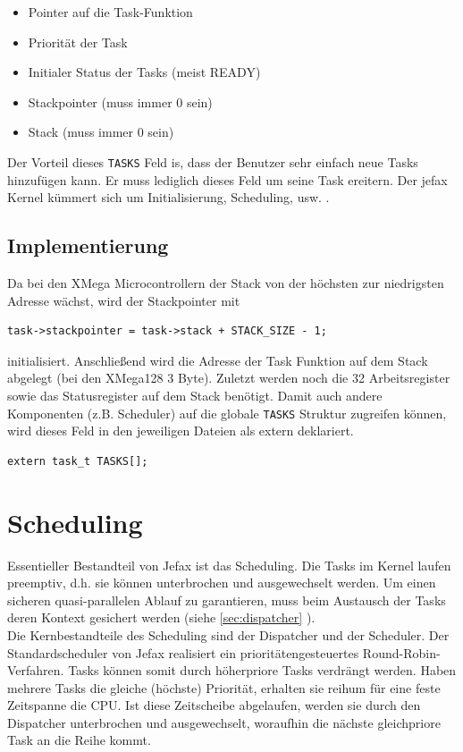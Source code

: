\documentclass[fontsize=12pt, toc=bibliography, notitlepage]{scrreprt}
\newcommand{\refnn}[1]{\ref{#1} \nameref{#1}}
\begin{document}
\begin{itemize}
\item Pointer auf die Task-Funktion
\item Priorität der Task
\item Initialer Status der Tasks (meist READY)
\item Stackpointer (muss immer 0 sein)
\item Stack (muss immer {0} sein)
\end{itemize}

Der Vorteil dieses \lstinline$TASKS$ Feld is, dass der Benutzer sehr einfach neue Tasks hinzufügen kann. Er muss lediglich dieses Feld um seine Task ereitern. Der jefax Kernel kümmert sich um Initialisierung, Scheduling, usw. .

\section{Implementierung}
\label{subsec:tasks-impl}
Da bei den XMega Microcontrollern der Stack von der höchsten zur niedrigsten Adresse wächst, wird der Stackpointer mit

\begin{lstlisting}
task->stackpointer = task->stack + STACK_SIZE - 1;
\end{lstlisting}

initialisiert. Anschließend wird die Adresse der Task Funktion auf dem Stack abgelegt (bei den XMega128 3 Byte). Zuletzt werden noch die 32 Arbeitsregister sowie das Statusregister auf dem Stack benötigt. Damit auch andere Komponenten (z.B. Scheduler) auf die globale \lstinline$TASKS$ Struktur zugreifen können, wird dieses Feld in den jeweiligen Dateien als extern deklariert.

\begin{lstlisting}
extern task_t TASKS[];
\end{lstlisting}

\chapter{Scheduling}
\label{chap:scheduling}
Essentieller Bestandteil von Jefax ist das Scheduling. Die Tasks im Kernel laufen preemptiv, d.h. sie können unterbrochen und ausgewechselt werden. Um einen sicheren quasi-parallelen Ablauf zu garantieren, muss beim Austausch der Tasks deren Kontext gesichert werden (siehe \refnn{sec:dispatcher}).\\
Die Kernbestandteile des Scheduling sind der Dispatcher und der Scheduler. Der Standardscheduler von Jefax realisiert ein prioritätengesteuertes Round-Robin-Verfahren. Tasks können somit durch höherpriore Tasks verdrängt werden. Haben mehrere Tasks die gleiche (höchste) Priorität, erhalten sie reihum für eine feste Zeitspanne die CPU. Ist diese Zeitscheibe abgelaufen, werden sie durch den Dispatcher unterbrochen und ausgewechselt, woraufhin die nächste gleichpriore Task an die Reihe kommt.
\end{document}
